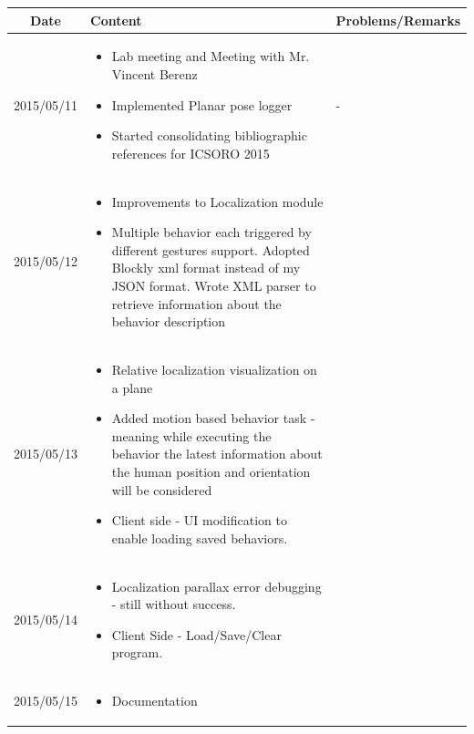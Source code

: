\documentclass[11pt]{article} %
\begin{document}
\begin{center}
    \begin{longtable}{ | c | p{6cm} | p{5cm} |}
    \hline
    Date & Content & Problems/Remarks \\ 
    \endhead
    \hline    
     2015/05/11         & 
  \begin{itemize}
  \item Lab meeting and Meeting with Mr. Vincent Berenz
  \item Implemented Planar pose logger
  \item Started consolidating bibliographic references for ICSORO 2015
\end{itemize}  
   & - \\
\hline
  										 
 2015/05/12         & 
  \begin{itemize}
  \item Improvements to Localization module
  \item Multiple behavior each triggered by different gestures support. Adopted Blockly xml format instead of my JSON format. Wrote XML parser to retrieve information about the behavior description
\end{itemize}   
& 
 \\
\hline
  										 
  
  2015/05/13        & 
  \begin{itemize}
  \item Relative localization visualization on a plane
  \item Added motion based behavior task - meaning while executing the behavior the latest information about the human position and orientation will be considered
  \item Client side - UI modification to enable loading saved behaviors.
  \end{itemize}   
  										 & 
 
  										 \\
  \hline
  
  2015/05/14         & 
  \begin{itemize}
  \item Localization parallax error debugging - still without success.
  \item Client Side - Load/Save/Clear program.
  \end{itemize}
  & 
\\  										 \hline

  2015/05/15         & 
  \begin{itemize}
  \item Documentation
\end{itemize}   
  & 
\\
  										 \hline
  										   								 
    \end{longtable}
\end{center}
\end{document}
